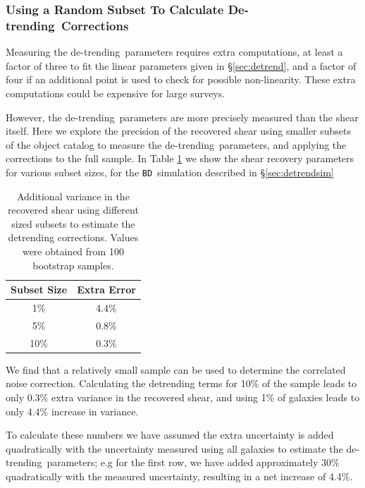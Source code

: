 \documentclass[usegraphicx,usenatbib]{mn2e}
\newcommand{\detrend}{de-trending}
\newcommand{\Detrend}{De-trending}
\newcommand{\bdsim}{\texttt{BD}}
\begin{document}
\subsubsection{Using a Random Subset To Calculate \Detrend\ Corrections}

Measuring the \detrend\ parameters requires extra computations, at least a
factor of three to fit the linear parameters given in \S \ref{sec:detrend}, and
a factor of four if an additional point is used to check for possible
non-linearity. These extra computations could be expensive for large surveys.  

However, the \detrend\ parameters are more precisely measured than the shear
itself.  Here we explore the precision of the recovered shear using smaller
subsets of the object catalog to measure the \detrend\ parameters, and
applying the corrections to the full sample.  In Table \ref{tab:subsets}
we show the shear recovery parameters for various subset sizes, for the
\bdsim\ simulation described in \S \ref{sec:detrendsim}

\begin{table}
    \centering
    \caption{Additional variance in the recovered shear 
        using different sized subsets to
        estimate the detrending corrections.  Values were obtained
        from 100 bootstrap samples. \label{tab:subsets}}
    \begin{tabular}{| c | c |}
        Subset Size & Extra Error \\
        \hline
        1\% & 4.4\% \\
        5\% & 0.8\% \\
        10\% & 0.3\% \\
    \end{tabular}
\end{table}


We find that a relatively small sample can be used to determine the correlated
noise correction.  Calculating the detrending terms for 10\% of the sample
leads to only 0.3\% extra variance in the recovered shear, and using 1\% of
galaxies leads to only 4.4\% increase in variance.

To calculate these numbers we have assumed the extra uncertainty is added
quadratically with the uncertainty measured using all galaxies to estimate the
\detrend\ parameters; e.g for the first row, we have added approximately 30\%
quadratically with the measured uncertainty, resulting in a net increase of
4.4\%.
\end{document}
